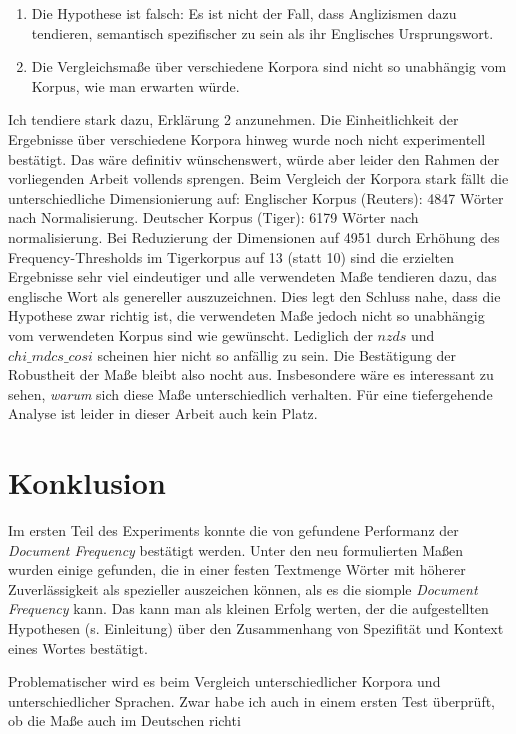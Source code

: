 \documentclass[11pt,numbers=noenddot]{scrartcl}
\begin{document}
\begin{enumerate}
    \item Die Hypothese ist falsch: Es ist nicht der Fall, dass Anglizismen dazu tendieren, semantisch spezifischer zu sein als ihr Englisches Ursprungswort.
    \item Die Vergleichsmaße über verschiedene Korpora sind nicht so unabhängig vom Korpus, wie man erwarten würde.
\end{enumerate}
Ich tendiere stark dazu, Erklärung 2 anzunehmen. Die Einheitlichkeit der Ergebnisse über verschiedene Korpora hinweg wurde noch nicht experimentell bestätigt. Das wäre definitiv wünschenswert, würde aber leider den Rahmen der vorliegenden Arbeit vollends sprengen. Beim Vergleich der Korpora stark fällt die unterschiedliche Dimensionierung auf: Englischer Korpus (Reuters): 4847 Wörter nach Normalisierung. Deutscher Korpus (Tiger): 6179 Wörter nach normalisierung. Bei Reduzierung der Dimensionen auf 4951 durch Erhöhung des Frequency-Thresholds im Tigerkorpus auf 13 (statt 10) sind die erzielten Ergebnisse sehr viel eindeutiger und alle verwendeten Maße tendieren dazu, das englische Wort als genereller auszuzeichnen. Dies legt den Schluss nahe, dass die Hypothese zwar richtig ist, die verwendeten Maße jedoch nicht so unabhängig vom verwendeten Korpus sind wie gewünscht. Lediglich der $nzds$ und $chi\_mdcs\_cosi$ scheinen hier nicht so anfällig zu sein. Die Bestätigung der Robustheit der Maße bleibt also nocht aus. Insbesondere wäre es interessant zu sehen, \emph{warum} sich diese Maße unterschiedlich verhalten. Für eine tiefergehende Analyse ist leider in dieser Arbeit auch kein Platz.

\section{Konklusion}

Im ersten Teil des Experiments konnte die von \citet{Caraballo99determiningthe} gefundene Performanz der \emph{Document Frequency} bestätigt werden. Unter den neu formulierten Maßen wurden einige gefunden, die in einer festen Textmenge Wörter mit höherer Zuverlässigkeit als spezieller auszeichen können, als es die siomple \emph{Document Frequency} kann. Das kann man als kleinen Erfolg werten, der die aufgestellten Hypothesen (s. Einleitung) über den Zusammenhang von Spezifität und Kontext eines Wortes bestätigt. 

Problematischer wird es beim Vergleich unterschiedlicher Korpora und unterschiedlicher Sprachen. Zwar habe ich auch in einem ersten Test überprüft, ob die Maße auch im Deutschen richti
\end{document}
